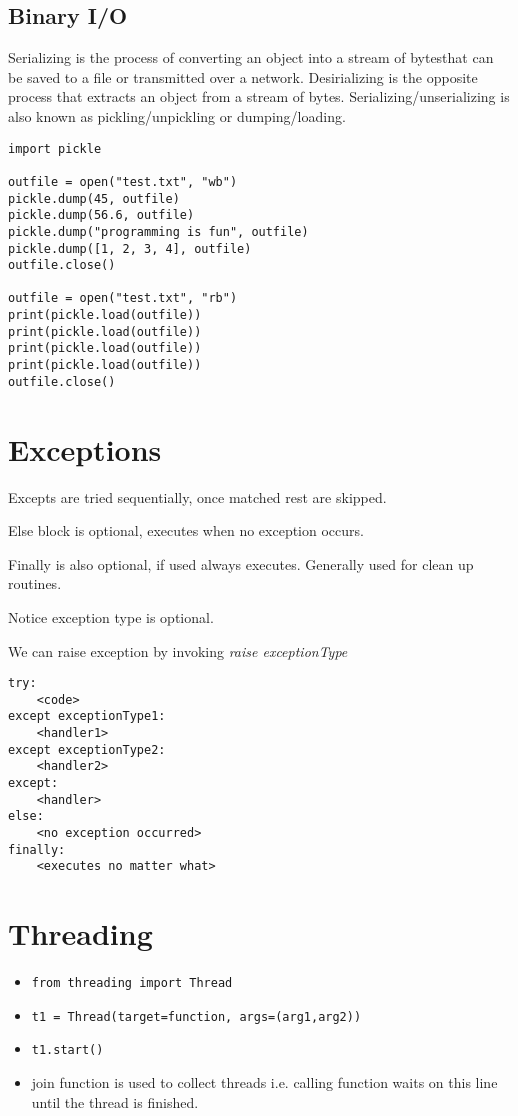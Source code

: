 \documentclass[a4paper, 12pt]{article}
\begin{document}
\subsection{Binary I/O}
Serializing is the process of converting an object into a stream of bytesthat can be saved to a file or transmitted over a network. Desirializing is the opposite process that extracts an object from a stream of bytes. Serializing/unserializing is also known as pickling/unpickling or dumping/loading.
\begin{verbatim}
import pickle

outfile = open("test.txt", "wb")
pickle.dump(45, outfile)
pickle.dump(56.6, outfile)
pickle.dump("programming is fun", outfile)
pickle.dump([1, 2, 3, 4], outfile)
outfile.close()

outfile = open("test.txt", "rb")
print(pickle.load(outfile))
print(pickle.load(outfile))
print(pickle.load(outfile))
print(pickle.load(outfile))
outfile.close()
\end{verbatim}

\section{Exceptions}
Excepts are tried sequentially, once matched rest are skipped.

Else block is optional, executes when no exception occurs.

Finally is also optional, if used always executes. Generally used for clean up routines.

Notice exception type is optional.

We can raise exception by invoking \emph{raise exceptionType}
\begin{verbatim}
try:
    <code>
except exceptionType1:
    <handler1>
except exceptionType2:
    <handler2>
except:
    <handler>
else:
    <no exception occurred>
finally:
    <executes no matter what>
\end{verbatim}

\section{Threading}
\begin{itemize}
	\item \verb|from threading import Thread|
	\item \verb|t1 = Thread(target=function, args=(arg1,arg2))|
	\item \verb|t1.start()|
	\item join function is used to collect threads i.e. calling function waits on this line until the thread is finished.
\end{itemize}
\end{document}
